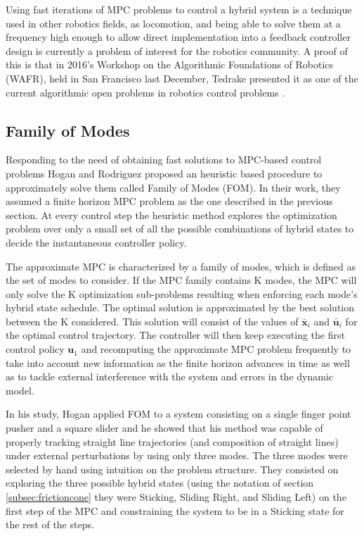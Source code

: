 \documentclass[12,twoside]{TFG-GM}
\theoremstyle{definition}
\theoremstyle{remark}
\newcommand*\diff[1]{\bar{#1}}
\begin{document}
Using fast iterations of MPC problems to control a hybrid system is a technique used in other robotics fields, as locomotion, and being able to solve them at a frequency high enough to allow direct implementation into a feedback controller design is currently a problem of interest for the robotics community. A proof of this is that in 2016's Workshop on the Algorithmic Foundations of Robotics (WAFR), held in San Francisco last December, Tedrake presented it as one of the current algorithmic open problems in robotics control problems \cite{tedrake_talk}.

\subsection{Family of Modes} 
\label{subsec:fom}

Responding to the need of obtaining fast solutions to MPC-based control problems Hogan and Rodriguez \cite{fom} proposed an heuristic based procedure to approximately solve them called Family of Modes (FOM). In their work, they assumed a finite horizon MPC problem as the one described in the previous section. At every control step the heuristic method explores the optimization problem over only a small set of all the possible combinations of hybrid states to decide the instantaneous controller policy.

The approximate MPC is characterized by a family of modes, which is defined as the set of modes to consider. If the MPC family contains K modes, the MPC will only solve the K optimization sub-problems resulting when enforcing each mode's hybrid state schedule. The optimal solution is approximated by the best solution between the K considered. This solution will consist of the values of $\diff{\textbf{x}}_i$ and $\diff{\textbf{u}}_i$ for the optimal control trajectory. The controller will then keep executing the first control policy $\textbf{u}_1$ and recomputing the approximate MPC problem frequently to take into account new information as the finite horizon advances in time as well as to tackle external interference with the system and errors in the dynamic model.

In his study, Hogan applied FOM to a system consisting on a single finger point pusher and a square slider and he showed that his method was capable of properly tracking straight line trajectories (and composition of straight lines) under external perturbations by using only three modes. The three modes were selected by hand using intuition on the problem structure. They consisted on exploring the three possible hybrid states (using the notation of section \ref{subsec:frictioncone} they were Sticking, Sliding Right, and Sliding Left) on the first step of the MPC and constraining the system to be in a Sticking state for the rest of the steps.
\end{document}
